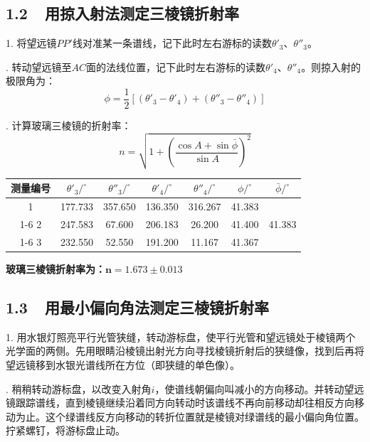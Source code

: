 \documentclass[fontset=windows]{ctexbook}
\begin{document}
\bigskip
\subsection*{ 1.2\ \ 用掠入射法测定三棱镜折射率}

1. 将望远镜$PP'$线对准某一条谱线，记下此时左右游标的读数$\theta'_3$、$\theta''_3$。

. 转动望远镜至$AC$面的法线位置，记下此时左右游标的读数$\theta'_4$、$\theta''_4$。则掠入射的极限角为：
\[
    \phi = \frac{1}{2}[(\theta'_3 - \theta'_4) + (\theta''_3 - \theta''_4)]
\]

. 计算玻璃三棱镜的折射率：
\[
    n = \sqrt{1 + \left(\frac{\cos A + \sin\bar{\phi}}{\sin A}\right)^2}
\]
\begin{table}[ht!]\Large
    \begin{center}
            \begin{tabular}{|c|c|c|c|c|c|c|}
            \hline
            测量编号 & $\theta'_3/^{\circ}$ & $\theta''_3/^{\circ}$ & $\theta'_4/^{\circ}$ & $\theta''_4/^{\circ}$ & $\phi/^{\circ}$ & $\bar{\phi}/^{\circ}$ \\
            \hline
            1 & 177.733 & 357.650 & 136.350 & 316.267 & 41.383 & \multirow{3}{*}{41.383} \\
            \cline{1-6}
            2 & 247.583 & 67.600  & 206.183 & 26.200  & 41.400 & \\
            \cline{1-6}
            3 & 232.550 & 52.550 & 191.200 & 11.167  & 41.367 & \\
            \hline
            \end{tabular}
    \end{center}
\end{table}

\textbf{玻璃三棱镜折射率为：$\boldsymbol{n = 1.673\pm0.013}$}

\bigskip
\subsection*{ 1.3\ \ 用最小偏向角法测定三棱镜折射率}

1. 用水银灯照亮平行光管狭缝，转动游标盘，使平行光管和望远镜处于棱镜两个光学面的两侧。先用眼睛沿棱镜出射光方向寻找棱镜折射后的狭缝像，找到后再将望远镜移到水银光谱线所在方位（即狭缝的单色像）。

. 稍稍转动游标盘，以改变入射角$i$，使谱线朝偏向叫减小的方向移动。并转动望远镜跟踪谱线，直到棱镜继续沿着同方向转动时该谱线不再向前移动却往相反方向移动为止。这个绿谱线反方向移动的转折位置就是棱镜对绿谱线的最小偏向角位置。拧紧螺钉，将游标盘止动。
\end{document}
